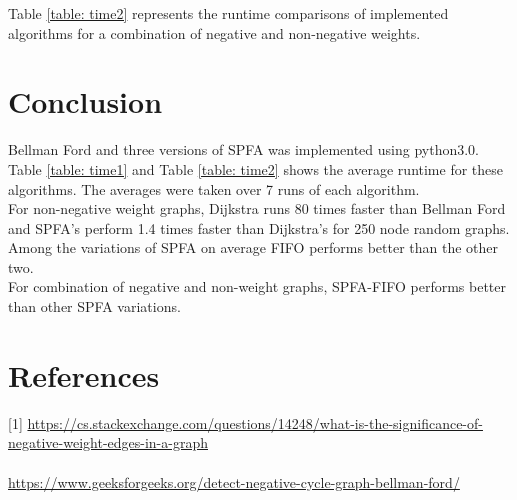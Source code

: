 \documentclass[12pt]{article}
\begin{document}
Table \ref{table: time2} represents the runtime comparisons of implemented algorithms for a combination of negative and non-negative weights. 

\section{Conclusion}
Bellman Ford and three versions of SPFA was implemented using python3.0. Table \ref{table: time1} and Table \ref{table: time2} shows the average runtime for these algorithms. The averages were taken over 7 runs of each algorithm. \\

For non-negative weight graphs, Dijkstra runs 80 times faster than Bellman Ford and SPFA's perform 1.4 times faster than Dijkstra's for 250 node random graphs. Among the variations of SPFA on average FIFO performs better than the other two. \\

For combination of negative and non-weight graphs, SPFA-FIFO performs better than other SPFA variations.\\  

\newpage
\section*{References}
[1] \url{https://cs.stackexchange.com/questions/14248/what-is-the-significance-of-negative-weight-edges-in-a-graph} \\
\\ \noindent
[2] \url{https://www.geeksforgeeks.org/detect-negative-cycle-graph-bellman-ford/}
\\ \noindent
\end{document}
